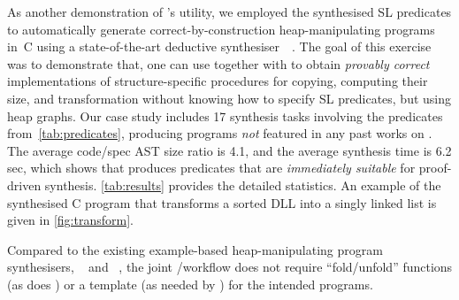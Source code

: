 As another demonstration of \tool's utility, we employed the
synthesised SL predicates to automatically generate
correct-by-construction heap-manipulating programs in~C using a
state-of-the-art deductive
synthesiser~\suslik~\cite{polikarpova2019structuring,WatanabeGPPS21}.
%
The goal of this exercise was to demonstrate that, one can use \tool
together with \suslik to obtain \emph{provably correct}
implementations of structure-specific procedures for copying,
computing their size, and transformation without knowing how to
specify SL predicates, but using heap graphs. Our case study includes
17 synthesis tasks involving the predicates
from~\autoref{tab:predicates}, producing programs \emph{not} featured
in any past works on \suslik.
%
The average code/spec AST size ratio is 4.1, and the average \suslik
synthesis time is 6.2 sec, which shows that \tool produces predicates
that are \emph{immediately suitable} for proof-driven synthesis.
%
\autoref{tab:results} provides the detailed statistics. An example of
the synthesised C program that transforms a sorted DLL into a singly
linked list is given in \autoref{fig:transform}.

Compared to the existing example-based heap-manipulating program
synthesisers, \spt~\cite{singh2012spt} and
\synbad~\cite{DBLP:conf/sas/Roy13}, the joint \tool/\suslik workflow
does not require ``fold/unfold'' functions (as does \spt) or a
template (as needed by \synbad) for the intended programs.

%         
      
  




